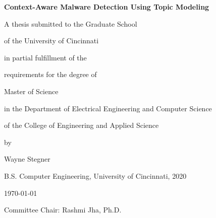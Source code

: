 \documentclass[../stegner_thesis.tex]{subfiles}
\begin{document}
\begin{titlepage}
	\centering
	\LARGE
	\par \textbf{Context-Aware Malware Detection Using Topic Modeling}
	\vfill
	\vfill
	\large
	\par A thesis submitted to the Graduate School
	\par of the University of Cincinnati
	\par in partial fulfillment of the
	\par requirements for the degree of
	\vfill
	\par Master of Science
	\vfill
	\par in the Department of Electrical Engineering and Computer Science
	\par of the College of Engineering and Applied Science
	\vfill
	\par by
	\vfill
	\par Wayne Stegner
	\par B.S. Computer Engineering, University of Cincinnati, 2020
	\vfill
	\par \today{}
	\vfill
	\par Committee Chair: Rashmi Jha, Ph.D.
	\vfill
\end{titlepage}
\end{document}
